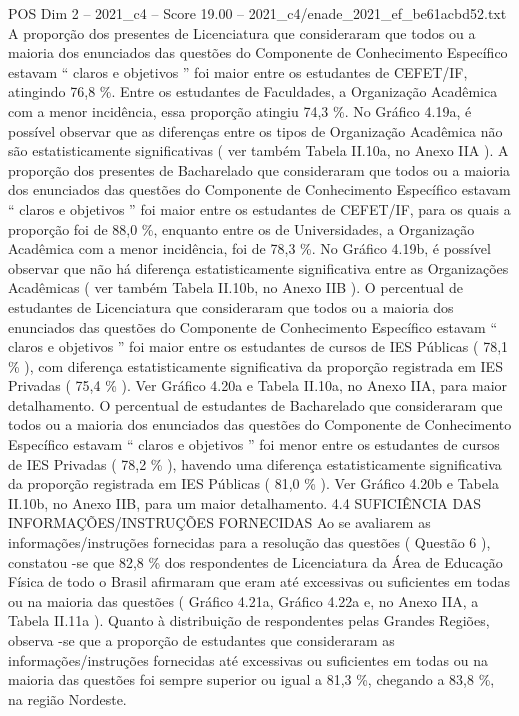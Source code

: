 \begin{textsample}{POS Dim 2 – 2021\_c4 – Score 19.00 – 2021\_c4/enade\_2021\_ef\_be61acbd52.txt}
A proporção dos presentes de Licenciatura que consideraram que todos ou a maioria dos enunciados das questões do Componente de Conhecimento Específico estavam “ claros e objetivos ” foi maior entre os estudantes de CEFET/IF, atingindo 76,8 \%.
Entre os estudantes de Faculdades, a Organização Acadêmica com a menor incidência, essa proporção atingiu 74,3 \%.
No Gráfico 4.19a, é possível observar que as diferenças entre os tipos de Organização Acadêmica não são estatisticamente significativas ( ver também Tabela II.10a, no Anexo IIA ).
A proporção dos presentes de Bacharelado que consideraram que todos ou a maioria dos enunciados das questões do Componente de Conhecimento Específico estavam “ claros e objetivos ” foi maior entre os estudantes de CEFET/IF, para os quais a proporção foi de 88,0 \%, enquanto entre os de Universidades, a Organização Acadêmica com a menor incidência, foi de 78,3 \%.
No Gráfico 4.19b, é possível observar que não há diferença estatisticamente significativa entre as Organizações Acadêmicas ( ver também Tabela II.10b, no Anexo IIB ).
O percentual de estudantes de Licenciatura que consideraram que todos ou a maioria dos enunciados das questões do Componente de Conhecimento Específico estavam “ claros e objetivos ” foi maior entre os estudantes de cursos de IES Públicas ( 78,1 \% ), com diferença estatisticamente significativa da proporção registrada em IES Privadas ( 75,4 \% ).
Ver Gráfico 4.20a e Tabela II.10a, no Anexo IIA, para maior detalhamento.
O percentual de estudantes de Bacharelado que consideraram que todos ou a maioria dos enunciados das questões do Componente de Conhecimento Específico estavam “ claros e objetivos ” foi menor entre os estudantes de cursos de IES Privadas ( 78,2 \% ), havendo uma diferença estatisticamente significativa da proporção registrada em IES Públicas ( 81,0 \% ).
Ver Gráfico 4.20b e Tabela II.10b, no Anexo IIB, para um maior detalhamento. 4.4 SUFICIÊNCIA DAS INFORMAÇÕES/INSTRUÇÕES FORNECIDAS Ao se avaliarem as informações/instruções fornecidas para a resolução das questões ( Questão 6 ), constatou -se que 82,8 \% dos respondentes de Licenciatura da Área de Educação Física de todo o Brasil afirmaram que eram até excessivas ou suficientes em todas ou na maioria das questões ( Gráfico 4.21a, Gráfico 4.22a e, no Anexo IIA, a Tabela II.11a ).
Quanto à distribuição de respondentes pelas Grandes Regiões, observa -se que a proporção de estudantes que consideraram as informações/instruções fornecidas até excessivas ou suficientes em todas ou na maioria das questões foi sempre superior ou igual a 81,3 \%, chegando a 83,8 \%, na região Nordeste.

\end{textsample}
